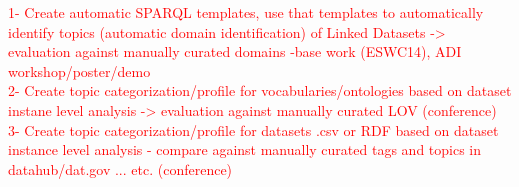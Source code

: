  
 \textcolor{red}{
 1- Create automatic SPARQL templates, use that templates to automatically identify topics (automatic domain identification) of Linked Datasets ->  evaluation against manually curated domains -base work (ESWC14), ADI workshop/poster/demo \\
 2- Create topic categorization/profile for vocabularies/ontologies based on dataset instane level analysis -> evaluation against manually curated LOV (conference)\\
 3-  Create topic categorization/profile for datasets .csv or RDF based on dataset instance level analysis - compare against manually curated tags and topics in datahub/dat.gov ... etc. (conference)
 }
 